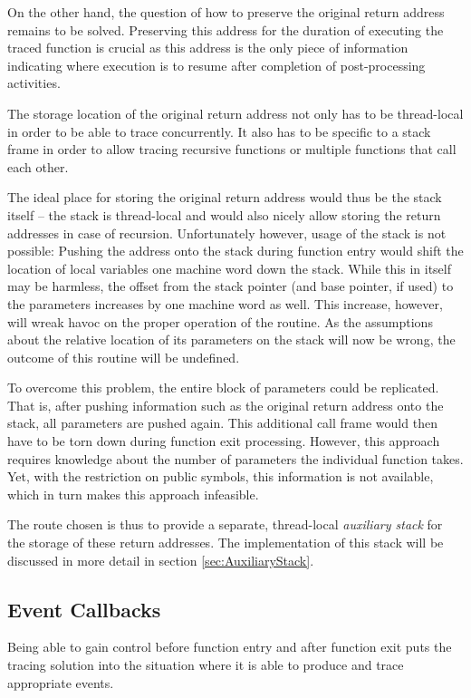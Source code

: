On the other hand, the question of how to preserve the original return address remains
to be solved. Preserving this address for the duration of executing the traced function
is crucial as this address is the only piece of information indicating where 
execution is to resume after completion of post-processing activities.

The storage location of the original return address not only has to be thread-local 
in order to be able to trace concurrently. It also has to be specific to a stack frame
in order to allow tracing recursive functions or multiple functions that call each other.

The ideal place for storing the original return address would thus be the stack itself -- the
stack is thread-local and would also nicely allow storing the return addresses in case
of recursion. Unfortunately however, usage of the stack is not possible: Pushing the 
address onto the stack during function entry would shift the location of local variables
one machine word down the stack. While this in itself may be harmless, the offset from the
stack pointer (and base pointer, if used) to the parameters increases by one machine word
as well. This increase, however, will wreak havoc on the proper operation of the routine.
As the assumptions about the relative location of its parameters on the stack will 
now be wrong, the outcome of this routine will be undefined.

To overcome this problem, the entire block of parameters could be replicated. That is,
after pushing information such as the original return address onto the stack, all parameters
are pushed again. This additional call frame would then have to be torn down during function
exit processing. However, this approach requires knowledge about the number of parameters
the individual function takes. Yet, with the restriction on public symbols, this information
is not available, which in turn makes this approach infeasible.

The route chosen is thus to provide a separate, thread-local \emph{auxiliary stack} 
for the storage of these return addresses. The implementation of this stack will be discussed in more 
detail in section \ref{sec:AuxiliaryStack}. 

\subsection{Event Callbacks}
Being able to gain control before function entry and after function exit puts the
tracing solution into the situation where it is able to produce and trace 
appropriate events.

